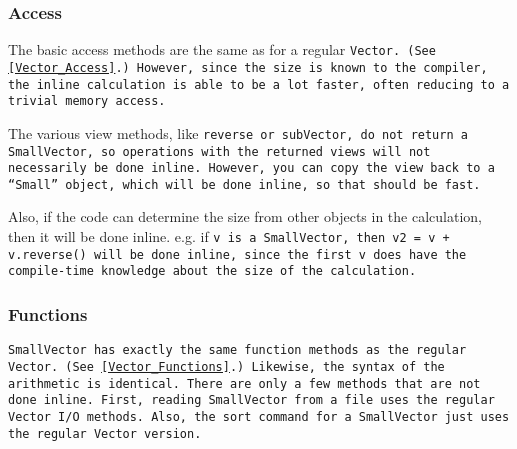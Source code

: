 \subsubsection{Access}
\label{SmallVector_Access}

The basic access methods are the same as for a regular \tt{Vector}.
(See \ref{Vector_Access}.)
However, since the size is known to the compiler, the inline calculation is able
to be a lot faster, often reducing to a trivial memory access.

The various view methods, like \tt{reverse} or \tt{subVector},
do not return a \tt{SmallVector}, so operations 
with the returned views will not necessarily be done inline.
However, you can copy the view back to a ``\tt{Small}'' object, which will be done 
inline, so that should be fast.

Also, if the code can determine the size from other objects in the calculation, then
it will be done inline.  e.g. if \tt{v} is a \tt{SmallVector}, then 
\tt{v2 = v + v.reverse()} will be done inline, since the first \tt{v} does have 
the compile-time knowledge about the size of the calculation.

\subsubsection{Functions}
\label{SmallVector_Functions}

\tt{SmallVector} has exactly the same
function methods as the regular \tt{Vector}.  
(See \ref{Vector_Functions}.)
Likewise, the syntax of the
arithmetic is identical.  There are only a few methods that 
are not done inline.  
First, reading \tt{SmallVector} from a file 
uses the regular
\tt{Vector} I/O methods.  
Also, the \tt{sort} command for a \tt{SmallVector} just uses the
regular \tt{Vector} version.

